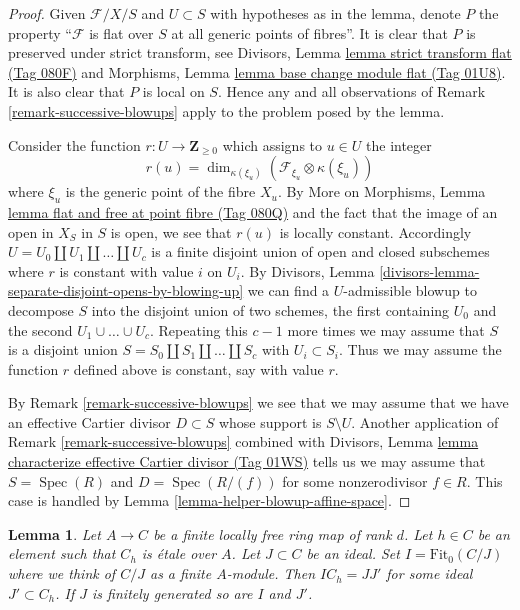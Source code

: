 \documentclass{amsart}
\theoremstyle{plain}
\newtheorem{lemma}[subsection]{Lemma}
\theoremstyle{definition}
\theoremstyle{remark}
\numberwithin{equation}{subsection}
\def\Spec{\mathop{\mathrm{Spec}}}
\begin{document}
\begin{proof}
Given $\mathcal{F}/X/S$ and $U \subset S$ with hypotheses as
in the lemma, denote $P$ the property ``$\mathcal{F}$ is flat over $S$ at
all generic points of fibres''. It is clear that $P$ is preserved under
strict transform, see
Divisors, Lemma \href{https://stacks.math.columbia.edu/tag/080F}{lemma strict transform flat (Tag 080F)}
and Morphisms, Lemma \href{https://stacks.math.columbia.edu/tag/01U8}{lemma base change module flat (Tag 01U8)}.
It is also clear that $P$ is local on $S$. Hence any and all observations
of Remark \ref{remark-successive-blowups} apply to the problem posed by
the lemma.

\medskip\noindent
Consider the function $r : U \to \mathbf{Z}_{\geq 0}$ which assigns to
$u \in U$ the integer
$$
r(u) = \dim_{\kappa(\xi_u)}(\mathcal{F}_{\xi_u} \otimes \kappa(\xi_u))
$$
where $\xi_u$ is the generic point of the fibre $X_u$.
By More on Morphisms, Lemma
\href{https://stacks.math.columbia.edu/tag/080Q}{lemma flat and free at point fibre (Tag 080Q)}
and the fact that the image of an open in $X_S$ in $S$ is open,
we see that $r(u)$ is locally constant. Accordingly
$U = U_0 \amalg U_1 \amalg \ldots \amalg U_c$ is a finite disjoint
union of open and closed subschemes where $r$ is constant with value
$i$ on $U_i$. By
Divisors, Lemma \ref{divisors-lemma-separate-disjoint-opens-by-blowing-up}
we can find a $U$-admissible blowup to decompose $S$ into
the disjoint union of two schemes, the first containing $U_0$ and
the second $U_1 \cup \ldots \cup U_c$. Repeating this $c - 1$
more times we may assume that $S$ is a disjoint union
$S = S_0 \amalg S_1 \amalg \ldots \amalg S_c$ with $U_i \subset S_i$.
Thus we may assume the function $r$ defined above is constant, say
with value $r$.

\medskip\noindent
By Remark \ref{remark-successive-blowups} we see that we may assume that
we have an effective Cartier divisor $D \subset S$ whose support is
$S \setminus U$. Another application of Remark \ref{remark-successive-blowups}
combined with
Divisors, Lemma \href{https://stacks.math.columbia.edu/tag/01WS}{lemma characterize effective Cartier divisor (Tag 01WS)}
tells us we may assume that
$S = \Spec(R)$ and $D = \Spec(R/(f))$ for some nonzerodivisor
$f \in R$. This case is handled by
Lemma \ref{lemma-helper-blowup-affine-space}.
\end{proof}


\begin{lemma}
\label{lemma-trick-fitting-ideal}
Let $A \to C$ be a finite locally free ring map of rank $d$.
Let $h \in C$ be an element such that $C_h$ is \'etale over $A$.
Let $J \subset C$ be an ideal. Set $I = \text{Fit}_0(C/J)$ where we
think of $C/J$ as a finite $A$-module. Then $IC_h = JJ'$ for some ideal
$J' \subset C_h$. If $J$ is finitely generated so are $I$ and $J'$.
\end{lemma}
\end{document}
